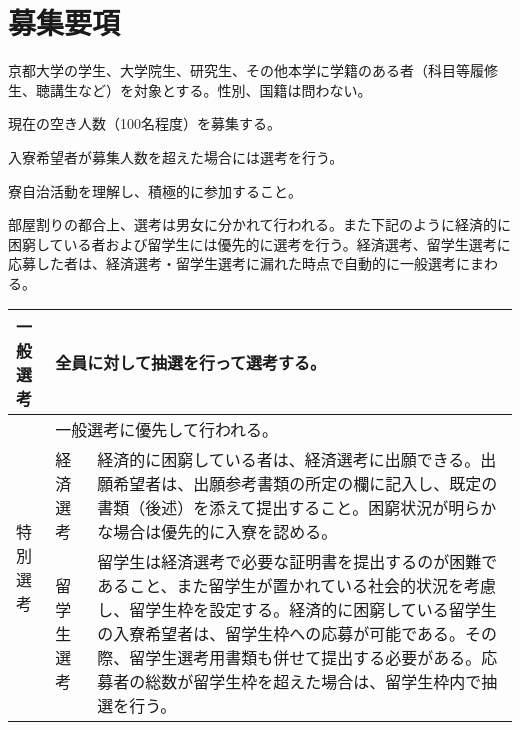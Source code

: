 \section{募集要項} \label{sec:admission}

京都大学の学生、大学院生、研究生、その他本学に学籍のある者（科目等履修生、聴講生など）を対象とする。性別、国籍は問わない。

現在の空き人数（100名程度）を募集する。

入寮希望者が募集人数を超えた場合には選考を行う。

寮自治活動を理解し、積極的に参加すること。

部屋割りの都合上、選考は男女に分かれて行われる。また下記のように経済的に困窮している者および留学生には優先的に選考を行う。経済選考、留学生選考に応募した者は、経済選考・留学生選考に漏れた時点で自動的に一般選考にまわる。


\begin{table}[hbt]
  \begin{tabular}{|l|lp{}|}
  \hline
  一般選考 & \multicolumn{2}{l|}{全員に対して抽選を行って選考する。} \\ \hline
  \multirow{3}{*}{特別選考} & \multicolumn{2}{l|}{一般選考に優先して行われる。} \\ \cline{2-3} 
   & 経済選考 & 経済的に困窮している者は、経済選考に出願できる。出願希望者は、出願参考書類の所定の欄に記入し、既定の書類（後述）を添えて提出すること。困窮状況が明らかな場合は優先的に入寮を認める。\\ \cline{2-3} 
   & 留学生選考 & 留学生は経済選考で必要な証明書を提出するのが困難であること、また留学生が置かれている社会的状況を考慮し、留学生枠を設定する。経済的に困窮している留学生の入寮希望者は、留学生枠への応募が可能である。その際、留学生選考用書類も併せて提出する必要がある。応募者の総数が留学生枠を超えた場合は、留学生枠内で抽選を行う。\\ \hline
  \end{tabular}
  \end{table}

